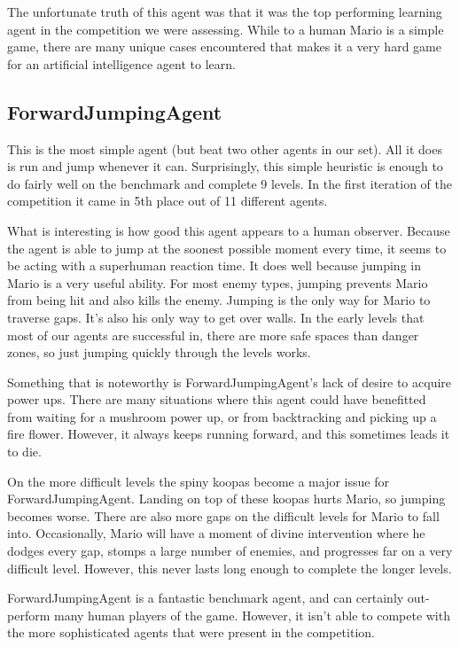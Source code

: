 \documentclass[12pt]{article}
\begin{document}
\begin{multicols*}{2}
The unfortunate truth of this agent was that it was the top performing learning agent in the competition 
we were assessing.  While to a human Mario is a simple game, there are many unique cases 
encountered that makes it a very hard game for an artificial intelligence agent to learn.

\subsection*{ForwardJumpingAgent}
This is the most simple agent (but beat two other agents in our set).  
All it does is run and jump whenever 
it can.  Surprisingly, this simple heuristic is enough to do fairly well on the benchmark and complete 
9 levels.  In the first iteration of the competition it came in 5th place out of 11 different agents.

What is interesting is how good this agent appears to a human observer.  Because the agent 
is able to jump at the soonest possible moment every time, it seems to be acting with a 
superhuman reaction time.  It does well because jumping in Mario is a very useful ability.  For 
most enemy types, jumping prevents Mario from being hit and also kills the enemy.  Jumping is the 
only way for Mario to traverse gaps.  It's also his only way to get over walls.  In the early levels that 
most of our agents are successful in, there are more safe spaces than danger zones, so just 
jumping quickly through the levels works.

Something that is noteworthy is ForwardJumpingAgent's lack of desire to acquire power ups.  There 
are many situations where this agent could have benefitted from waiting for a mushroom power up, or 
from backtracking and picking up a fire flower.  However, it always keeps running forward, and this 
sometimes leads it to die.

On the more difficult levels the spiny koopas become a major issue for ForwardJumpingAgent.  
Landing on top of these koopas hurts Mario, so jumping becomes worse.  There are also more gaps 
on the difficult levels for Mario to fall into.  Occasionally, Mario will have a moment of divine 
intervention where he dodges every gap, stomps a large number of enemies, and progresses far 
on a very difficult level.  However, this never lasts long enough to complete the longer levels.

ForwardJumpingAgent is a fantastic benchmark agent, and can certainly out-perform many 
human players of the game.  However, it isn't able to compete with the more sophisticated agents 
that were present in the competition.


\end{multicols*}
\end{document}
